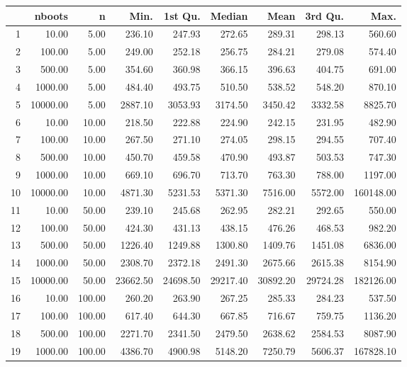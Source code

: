 \begin{table}[ht]
\centering
\begin{tabular}{rrrrrrrrr}
  \hline
 & nboots & n & Min. & 1st Qu. & Median & Mean & 3rd Qu. & Max. \\ 
  \hline
1 & 10.00 & 5.00 & 236.10 & 247.93 & 272.65 & 289.31 & 298.13 & 560.60 \\ 
  2 & 100.00 & 5.00 & 249.00 & 252.18 & 256.75 & 284.21 & 279.08 & 574.40 \\ 
  3 & 500.00 & 5.00 & 354.60 & 360.98 & 366.15 & 396.63 & 404.75 & 691.00 \\ 
  4 & 1000.00 & 5.00 & 484.40 & 493.75 & 510.50 & 538.52 & 548.20 & 870.10 \\ 
  5 & 10000.00 & 5.00 & 2887.10 & 3053.93 & 3174.50 & 3450.42 & 3332.58 & 8825.70 \\ 
  6 & 10.00 & 10.00 & 218.50 & 222.88 & 224.90 & 242.15 & 231.95 & 482.90 \\ 
  7 & 100.00 & 10.00 & 267.50 & 271.10 & 274.05 & 298.15 & 294.55 & 707.40 \\ 
  8 & 500.00 & 10.00 & 450.70 & 459.58 & 470.90 & 493.87 & 503.53 & 747.30 \\ 
  9 & 1000.00 & 10.00 & 669.10 & 696.70 & 713.70 & 763.30 & 788.00 & 1197.00 \\ 
  10 & 10000.00 & 10.00 & 4871.30 & 5231.53 & 5371.30 & 7516.00 & 5572.00 & 160148.00 \\ 
  11 & 10.00 & 50.00 & 239.10 & 245.68 & 262.95 & 282.21 & 292.65 & 550.00 \\ 
  12 & 100.00 & 50.00 & 424.30 & 431.13 & 438.15 & 476.26 & 468.53 & 982.20 \\ 
  13 & 500.00 & 50.00 & 1226.40 & 1249.88 & 1300.80 & 1409.76 & 1451.08 & 6836.00 \\ 
  14 & 1000.00 & 50.00 & 2308.70 & 2372.18 & 2491.30 & 2675.66 & 2615.38 & 8154.90 \\ 
  15 & 10000.00 & 50.00 & 23662.50 & 24698.50 & 29217.40 & 30892.20 & 29724.28 & 182126.00 \\ 
  16 & 10.00 & 100.00 & 260.20 & 263.90 & 267.25 & 285.33 & 284.23 & 537.50 \\ 
  17 & 100.00 & 100.00 & 617.40 & 644.30 & 667.85 & 716.67 & 759.75 & 1136.20 \\ 
  18 & 500.00 & 100.00 & 2271.70 & 2341.50 & 2479.50 & 2638.62 & 2584.53 & 8087.90 \\ 
  19 & 1000.00 & 100.00 & 4386.70 & 4900.98 & 5148.20 & 7250.79 & 5606.37 & 167828.10 \\ 

\end{tabular}
\end{table}
